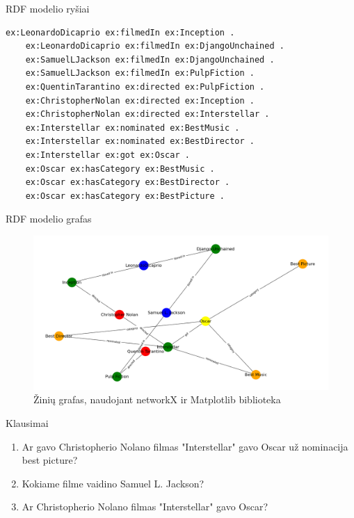 \documentclass[10pt]{beamer}
\begin{document}
\begin{frame}[fragile]{RDF modelio ryšiai}
    \begin{lstlisting}[captionpos=b, caption=RDF modelio ryšiai, label=lst:sparql,
   basicstyle=\ttfamily\scriptsize,frame=single]
    ex:LeonardoDicaprio ex:filmedIn ex:Inception .
    ex:LeonardoDicaprio ex:filmedIn ex:DjangoUnchained .
    ex:SamuelLJackson ex:filmedIn ex:DjangoUnchained .
    ex:SamuelLJackson ex:filmedIn ex:PulpFiction .
    ex:QuentinTarantino ex:directed ex:PulpFiction .
    ex:ChristopherNolan ex:directed ex:Inception .
    ex:ChristopherNolan ex:directed ex:Interstellar .
    ex:Interstellar ex:nominated ex:BestMusic .
    ex:Interstellar ex:nominated ex:BestDirector .
    ex:Interstellar ex:got ex:Oscar .
    ex:Oscar ex:hasCategory ex:BestMusic .
    ex:Oscar ex:hasCategory ex:BestDirector .
    ex:Oscar ex:hasCategory ex:BestPicture .
    \end{lstlisting}
\end{frame}

\begin{frame}[fragile]{RDF modelio grafas}
    \begin{figure}[htbp]
        \centering
        \includegraphics[width=1\textwidth]{img/last_graph_rdf.png}
        \caption{Žinių grafas, naudojant networkX ir Matplotlib biblioteka}
        \label{fig:last_graph_rdf}
    \end{figure}
\end{frame}

\begin{frame}[fragile]{Klausimai}
    \begin{enumerate}
        \item Ar gavo Christopherio Nolano filmas "Interstellar" gavo Oscar už nominacija best picture?
        \item Kokiame filme vaidino Samuel L. Jackson?
        \item Ar Christopherio Nolano filmas "Interstellar" gavo Oscar?
    \end{enumerate}
\end{frame}
\end{document}

